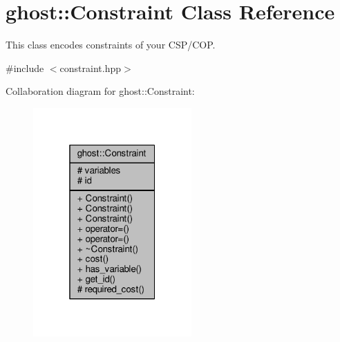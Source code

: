 \hypertarget{classghost_1_1Constraint}{}\section{ghost\+:\+:Constraint Class Reference}
\label{classghost_1_1Constraint}


This class encodes constraints of your C\+S\+P/\+C\+OP.  




{\ttfamily \#include $<$constraint.\+hpp$>$}



Collaboration diagram for ghost\+:\+:Constraint\+:\nopagebreak
\begin{figure}[H]
\begin{center}
\leavevmode
\includegraphics[width=172pt]{classghost_1_1Constraint__coll__graph}
\end{center}
\end{figure}
